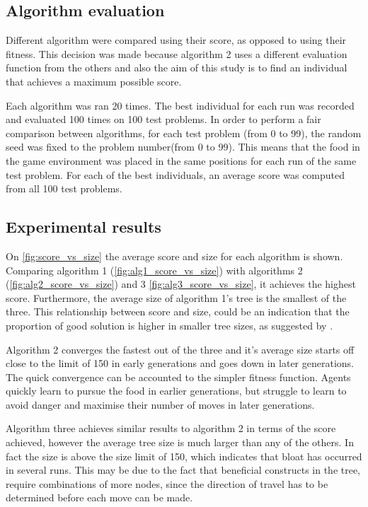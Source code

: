 \documentclass[12pt,a4paper]{article}
\begin{document}
		\subsection{Algorithm evaluation} \label{subsec:evaluation}
		Different algorithm were compared using their score, as opposed to using their fitness. This decision was made because algorithm 2 uses a different evaluation function from the others and also the aim of this study is to find an individual that achieves a maximum possible score.
		
		Each algorithm was ran 20 times. The best individual for each run was recorded and evaluated 100 times on 100 test problems. In order to perform a fair comparison between algorithms, for each test problem (from 0 to 99), the random seed was fixed to the problem number(from 0 to 99). This means that the food in the game environment was placed in the same positions for each run of the same test problem. For each of the best individuals, an average score was computed from all 100 test problems.
		
		
		\subsection{Experimental results} \label{subsec:results}
		On \autoref{fig:score_vs_size} the average score and size for each algorithm is shown. Comparing algorithm 1 (\autoref{fig:alg1_score_vs_size}) with algorithms 2 (\autoref{fig:alg2_score_vs_size}) and 3 \autoref{fig:alg3_score_vs_size}, it achieves the highest score. Furthermore, the average size of algorithm 1's tree is the smallest of the three. This relationship between score and size, could be an indication that the proportion of good solution is higher in smaller tree sizes, as suggested by \cite{langdon_why_1998}.
		
		Algorithm 2 converges the fastest out of the three and it's average size starts off close to the limit of 150 in early generations and goes down in later generations. The quick convergence can be accounted to the simpler fitness function. Agents quickly learn to pursue the food in earlier generations, but struggle to learn to avoid danger and maximise their number of moves in later generations.
		
		Algorithm three achieves similar results to algorithm 2 in terms of the score achieved, however the average tree size is much larger than any of the others. In fact the size is above the size limit of 150, which indicates that bloat has occurred in several runs. This may be due to the fact that beneficial constructs in the tree, require combinations of more nodes, since the direction of travel has to be determined before each move can be made.
		
\end{document}
